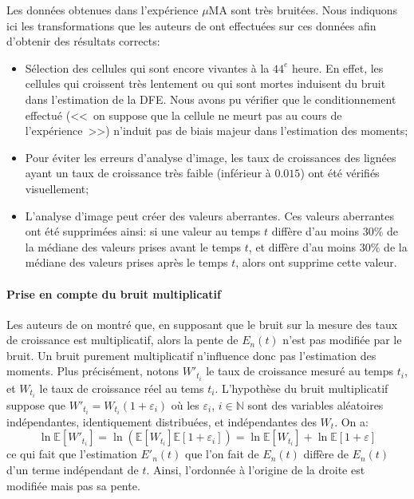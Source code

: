 \documentclass[12pt]{article}
\newcommand{\pth}[1]{\left(#1\right)}
\newcommand{\cro}[1]{\left[#1\right]}
\newcommand{\En}{\mathbb{N}}
\newcommand{\Esp}[1]{\mathbb{E}\cro{#1}}
\begin{document}
Les données obtenues dans l'expérience $\mu$MA sont très bruitées. Nous indiquons ici les transformations que les auteurs de \cite{ref} ont effectuées sur ces données afin d'obtenir des résultats corrects:
\begin{itemize}
\item Sélection des cellules qui sont encore vivantes à la $44^e$ heure. En effet, les cellules qui croissent très lentement ou qui sont mortes induisent du bruit dans l'estimation de la DFE. Nous avons pu vérifier que le conditionnement effectué (<<~on suppose que la cellule ne meurt pas au cours de l'expérience~>>) n'induit pas de biais majeur dans l'estimation des moments;
\item Pour éviter les erreurs d'analyse d'image, les taux de croissances des lignées ayant un taux de croissance très faible (inférieur à $0.015$) ont été vérifiés visuellement;
\item L'analyse d'image peut créer des valeurs aberrantes. Ces valeurs aberrantes ont été supprimées ainsi: si une valeur au temps $t$ diffère d'au moins $30\%$ de la médiane des valeurs prises avant le temps $t$, et diffère d'au moins $30\%$ de la médiane des valeurs prises après le temps $t$, alors ont supprime cette valeur.
\end{itemize}


\paragraph{Prise en compte du bruit multiplicatif}

Les auteurs de \cite{rob} on montré que, en supposant que le bruit sur la mesure des taux de croissance est multiplicatif, alors la pente de $E_n(t)$ n'est pas modifiée par le bruit. Un bruit purement multiplicatif n'influence donc pas l'estimation des moments. Plus précisément, notons $W'_{t_i}$ le taux de croissance mesuré au temps $t_i$, et $W_{t_i}$ le taux de croissance réel au tems $t_i$. L'hypothèse du bruit multiplicatif suppose que $W'_{t_i}=W_{t_i}(1+\varepsilon_i)$ où les $\varepsilon_i$, $i\in\En$ sont des variables aléatoires indépendantes, identiquement distribuées, et indépendantes des $W_t$. On a:
\[\ln\Esp{W'_{t_i}}=\ln\pth{\Esp{W_{t_i}}\Esp{1+\varepsilon_i}}=\ln\Esp{W_{t_i}}+\ln\Esp{1+\varepsilon}\]
ce qui fait que l'estimation $E'_n(t)$ que l'on fait de $E_n(t)$ diffère de $E_n(t)$ d'un terme indépendant de $t$. Ainsi, l'ordonnée à l'origine de la droite est modifiée mais pas sa pente.
\end{document}
